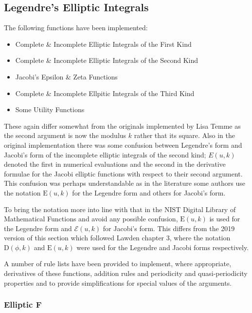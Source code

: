 \subsection{Legendre's Elliptic Integrals}
\hypertarget{ELLIPI}{}
The following functions have been implemented:

\begin{itemize}
\item Complete \& Incomplete Elliptic Integrals of the First Kind
\item Complete \& Incomplete Elliptic Integrals of the Second Kind
\item Jacobi's Epsilon \& Zeta Functions
\item Complete \& Incomplete Ellpitic Integrals of the Third Kind
\item Some Utility Functions  
\end{itemize}

These again differ somewhat from the originals implemented by Lisa Temme
as the second argument is now the modulus $k$ rather that its square.
Also in the original implementation  there was some confusion between
Legendre's form and Jacobi's form of the incomplete elliptic integrals of
the second kind; $E(u,k)$ denoted the first in numerical
evaluations and the second in the derivative formulae for the Jacobi
elliptic functions with respect to their second argument.
This confusion was perhaps understandable
as in the literature some authors use the notation $\mathrm{E}(u, k)$ for
the Legendre form and others for Jacobi's form.

To bring the notation more into line with that in the NIST Digital Library of
Mathematical Functions and avoid any possible confusion, $\mathrm{E}(u, k)$ is used for
the Legendre form and $\mathcal{E}(u, k)$ for Jacobi's form.
This differs from the 2019 version of this section which followed Lawden
\cite{Lawden:89} chapter 3, where the notation $\mathrm{D}(\phi, k)$ and
$\mathrm{E}(u, k)$ were used for the Legendre and Jacobi forms respectively.

A number of rule lists have been provided to implement, where appropriate,
derivatives of these functions, addition rules and periodicity and
quasi-periodicity properties and to provide simplifications for special values
of the arguments.

\subsubsection{Elliptic F}
\hypertarget{operator:ELLIPTICF}{}

